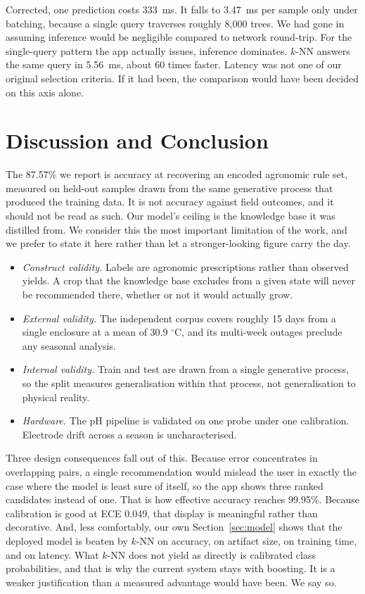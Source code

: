 \documentclass[conference]{IEEEtran}
\begin{document}
Corrected, one prediction costs 333~ms. It falls to 3.47~ms per sample only
under batching, because a single query traverses roughly 8{,}000 trees. We
had gone in assuming inference would be negligible compared to network
round-trip. For the single-query pattern the app actually issues, inference
dominates. $k$-NN answers the same query in 5.56~ms, about 60 times faster.
Latency was not one of our original selection criteria. If it had been, the
comparison would have been decided on this axis alone.

\section{Discussion and Conclusion}
The 87.57\% we report is accuracy at recovering an encoded agronomic rule
set, measured on held-out samples drawn from the same generative process
that produced the training data. It is not accuracy against field outcomes,
and it should not be read as such. Our model's ceiling is the knowledge base
it was distilled from. We consider this the most important limitation of the
work, and we prefer to state it here rather than let a stronger-looking
figure carry the day.

\begin{itemize}
\item \textit{Construct validity.} Labels are agronomic prescriptions rather
      than observed yields. A crop that the knowledge base excludes from a
      given state will never be recommended there, whether or not it would
      actually grow.
\item \textit{External validity.} The independent corpus covers roughly 15
      days from a single enclosure at a mean of 30.9 $^{\circ}$C, and its
      multi-week outages preclude any seasonal analysis.
\item \textit{Internal validity.} Train and test are drawn from a single
      generative process, so the split measures generalisation within that
      process, not generalisation to physical reality.
\item \textit{Hardware.} The pH pipeline is validated on one probe under one
      calibration. Electrode drift across a season is uncharacterised.
\end{itemize}

Three design consequences fall out of this. Because error concentrates in
overlapping pairs, a single recommendation would mislead the user in exactly
the case where the model is least sure of itself, so the app shows three
ranked candidates instead of one. That is how effective accuracy reaches
99.95\%. Because calibration is good at ECE 0.049, that display is
meaningful rather than decorative. And, less comfortably, our own
Section~\ref{sec:model} shows that the deployed model is beaten by $k$-NN on
accuracy, on artifact size, on training time, and on latency. What $k$-NN
does not yield as directly is calibrated class probabilities, and that is
why the current system stays with boosting. It is a weaker justification
than a measured advantage would have been. We say so.
\end{document}
